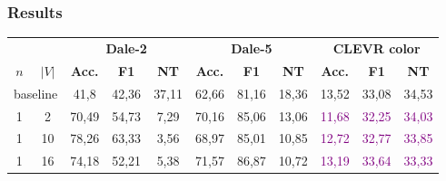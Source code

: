 \subsubsection*{Results}
\begin{table}[ht]
    \centering
    \begin{tabular}{cc|ccc|ccc|ccc}
        \toprule
                                      &        & \multicolumn{3}{c}{\textbf{Dale-2}} & \multicolumn{3}{c}{\textbf{Dale-5}} & \multicolumn{3}{c}{\textbf{CLEVR color}}                                                                                                                                                                         \\  \cmidrule(lr){3-5}\cmidrule(lr){6-8}\cmidrule(lr){9-11}
        $n$                           & $|V|$  & \textbf{Acc.}                       & \textbf{F1}                         & \textbf{NT}                              & \textbf{Acc.}             & \textbf{F1}               & \textbf{NT}               & \textbf{Acc.}             & \textbf{F1}               & \textbf{NT}               \\\midrule
        \multicolumn{2}{c|}{baseline} & {41,8} & {42,36}                             & {37,11}                             & {62,66}                                  & {81,16}                   & {18,36}                   & {13,52}                   & {33,08}                   & {34,53}                                               \\\midrule
        {1}                           & {2}    & {70,49}                             & {54,73}                             & {7,29}                                   & {70,16}                   & {85,06}                   & {13,06}                   & \textcolor{purple}{11,68} & \textcolor{purple}{32,25} & \textcolor{purple}{34,03} \\
        {1}                           & {10}   & {78,26}                             & {63,33}                             & {3,56}                                   & {68,97}                   & {85,01}                   & {10,85}                   & \textcolor{purple}{12,72} & \textcolor{purple}{32,77} & \textcolor{purple}{33,85} \\
        {1}                           & {16}   & {74,18}                             & {52,21}                             & {5,38}                                   & {71,57}                   & {86,87}                   & {10,72}                   & \textcolor{purple}{13,19} & \textcolor{purple}{33,64} & \textcolor{purple}{33,33} \\

\end{tabular}
\end{table}
